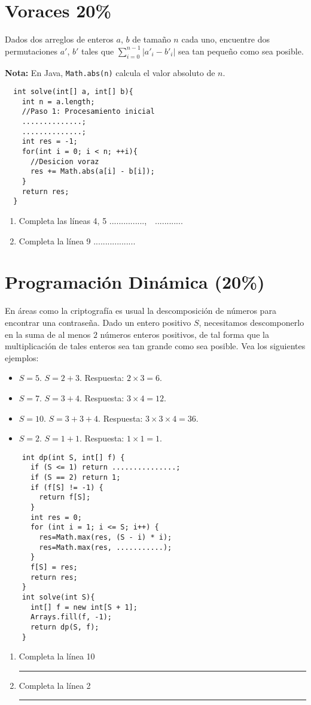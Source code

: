 \documentclass[9.5 pt]{article}
\begin{document}
\begin{multicols}{2}
	
\section{Voraces 20\%}
	  Dados dos arreglos de enteros $a$, $b$ de tamaño $n$ cada uno, encuentre dos permutaciones $a'$, $b'$ tales que $\sum\limits_{i = 0}^{n - 1}{|a'_i - b'_i|}$ sea tan pequeño como sea posible.

{\footnotesize
  \textbf{Nota: } En Java, \texttt{Math.abs(n)} calcula el valor absoluto de $n$.
  \begin{lstlisting}
  int solve(int[] a, int[] b){
    int n = a.length;
    //Paso 1: Procesamiento inicial
    ..............;
    ..............;
    int res = -1;
    for(int i = 0; i < n; ++i){
      //Desicion voraz
      res += Math.abs(a[i] - b[i]);
    }
    return res;
  }
  \end{lstlisting}
  }

	\begin{enumerate}[label=\alph*)]
		\item Completa las líneas 4, 5 ...............,\ \  ............
		\item Completa la línea 9 ..................
	\end{enumerate}

	
	\section{Programación Dinámica (20\%)}
	En áreas como la criptografía es usual la descomposición de números para encontrar una contraseña.  Dado un entero positivo $S$, necesitamos descomponerlo en la suma de al menos $2$ números enteros positivos, de tal forma que la multiplicación de tales enteros sea tan grande como sea posible. Vea los siguientes ejemplos:
	\begin{itemize}[noitemsep]
		\item $S = 5$. $S = 2 + 3$. Respuesta: $2\times 3 = 6$.
		\item $S = 7$. $S = 3 + 4$. Respuesta: $3\times 4 = 12$.
		\item $S = 10$. $S = 3 + 3 + 4$. Respuesta: $3 \times 3 \times 4 = 36$.
		\item $S = 2$. $S = 1 + 1$. Respuesta: $1 \times 1 = 1$.  
	\end{itemize}
	\begin{lstlisting}
	int dp(int S, int[] f) {
	  if (S <= 1) return ...............;
	  if (S == 2) return 1;
	  if (f[S] != -1) {
	    return f[S];
	  }
	  int res = 0;
	  for (int i = 1; i <= S; i++) {
	    res=Math.max(res, (S - i) * i);
	    res=Math.max(res, ...........);
	  }
	  f[S] = res;
	  return res;
	}
	int solve(int S){
	  int[] f = new int[S + 1];
	  Arrays.fill(f, -1);
	  return dp(S, f);
	}
	\end{lstlisting}
	\begin{enumerate}[label=\alph*]
		\item Completa la línea 10
		\indent\rule {100pt}{0.4pt}
		\item Completa la línea 2
		\indent\rule {105pt}{0.4pt}
	\end{enumerate}
\end{multicols}
\end{document}
